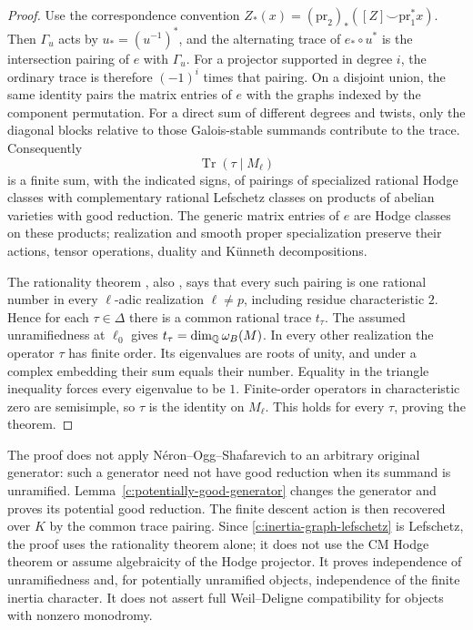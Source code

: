 \begin{proof}
Use the correspondence convention
$Z_*(x)=(\mathrm{pr}_2)_*([Z]\smile\mathrm{pr}_1^*x)$.
Then $\Gamma_u$ acts by $u_*=(u^{-1})^*$, and the alternating trace of
$e_*\circ u^*$ is the intersection pairing of $e$ with $\Gamma_u$.
For a projector supported in degree $i$, the ordinary trace is therefore
$(-1)^i$ times that pairing.  On a disjoint union, the same identity pairs
the matrix entries of $e$ with the graphs indexed by the component
permutation.  For a direct sum of different degrees and twists, only
the diagonal blocks relative to those Galois-stable summands contribute
to the trace.  Consequently
\[
 \operatorname{Tr}(\tau\mid M_\ell)
\]
is a finite sum, with the indicated signs, of pairings of specialized
rational Hodge classes with complementary rational Lefschetz classes on
products of abelian varieties with good reduction.  The generic matrix
entries of $e$ are Hodge classes on these products; realization and smooth
proper specialization preserve their actions, tensor operations, duality
and K\"unneth decompositions.

The rationality theorem \citep[Theorem 1.1]{c_rationality2026}, also
\citep[Theorem 1.1, pp.~1--2]{c_rationalityexposition2026}, says that every
such pairing is one rational number in every $\ell$-adic realization
$\ell\ne p$, including residue characteristic $2$.  Hence for each
$\tau\in\Delta$ there is a common rational trace $t_\tau$.
The assumed unramifiedness at $\ell_0$ gives
$t_\tau=\dim_\mathbb Q\omega_B(M)$.  In every other realization the operator
$\tau$ has finite order.  Its eigenvalues are roots of unity, and under a
complex embedding their sum equals their number.  Equality in the triangle
inequality forces every eigenvalue to be $1$.  Finite-order operators in
characteristic zero are semisimple, so $\tau$ is the identity on $M_\ell$.
This holds for every $\tau$, proving the theorem.
\end{proof}

\begin{remark}
\label{c:ell-independence-new-input}
The proof does not apply N\'eron--Ogg--Shafarevich to an arbitrary original
generator: such a generator need not have good reduction when its summand
is unramified.  Lemma~\ref{c:potentially-good-generator} changes the
generator and proves its potential good reduction.  The finite descent
action is then recovered over $K$ by the common trace pairing.  Since
\eqref{c:inertia-graph-lefschetz} is Lefschetz, the proof uses the
rationality theorem alone; it does not use the CM Hodge theorem or assume
algebraicity of the Hodge projector.  It proves independence of
unramifiedness and, for potentially unramified objects, independence of
the finite inertia character.  It does not assert full Weil--Deligne
compatibility for objects with nonzero monodromy.
\end{remark}

